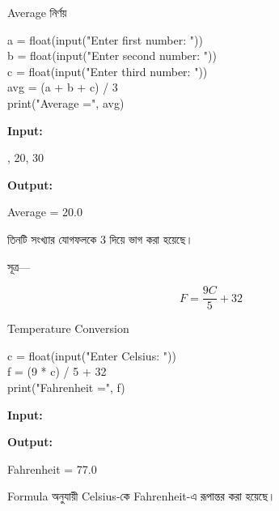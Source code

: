 \begin{codeoutputbox}{Average নির্ণয়}

\noindent
\begin{minipage}[t]{0.59\linewidth}
\codeheading

\begin{english}
\ttfamily
a = float(input("Enter first number: "))\\
b = float(input("Enter second number: "))\\
c = float(input("Enter third number: "))\\[0.5mm]
avg = (a + b + c) / 3\\
print("Average =", avg)
\end{english}

\end{minipage}
\hfill
\begin{minipage}[t]{0.37\linewidth}
\outputheading

\textbf{Input:}

\textenglish{, 20, 30}

\medskip

\textbf{Output:}

\textenglish{\ttfamily Average = 20.0}

\medskip

তিনটি সংখ্যার যোগফলকে 3 দিয়ে ভাগ করা হয়েছে।

\end{minipage}

\end{codeoutputbox}



সূত্র—

\[
F=\frac{9C}{5}+32
\]

\begin{codeoutputbox}{Temperature Conversion}

\noindent
\begin{minipage}[t]{0.56\linewidth}
\codeheading

\begin{english}
\ttfamily
c = float(input("Enter Celsius: "))\\[0.5mm]
f = (9 * c) / 5 + 32\\
print("Fahrenheit =", f)
\end{english}

\end{minipage}
\hfill
\begin{minipage}[t]{0.40\linewidth}
\outputheading

\textbf{Input:}
\textenglish{}

\medskip

\textbf{Output:}

\textenglish{\ttfamily Fahrenheit = 77.0}

\medskip

Formula অনুযায়ী Celsius-কে Fahrenheit-এ রূপান্তর করা হয়েছে।

\end{minipage}

\end{codeoutputbox}

